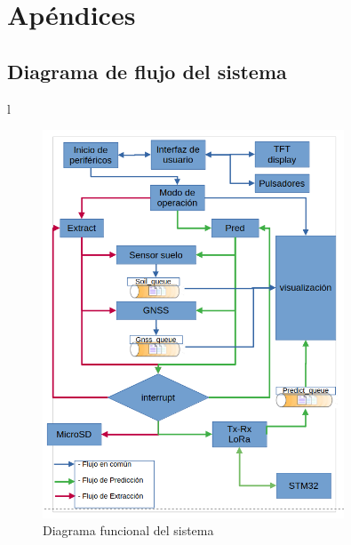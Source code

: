 \documentclass[12pt,a4paper, twosite]{article}
\begin{document}
\section{Apéndices}

\subsection{Diagrama de flujo del sistema}
l\label{sec:diagrama}
\begin{figure}[ht]
  \centering
  \includegraphics[width=0.8\textwidth]{img/system.png}
  \caption{Diagrama funcional del sistema}
  \label{fig:producer-consumer}
  \end{figure}
\end{document}
